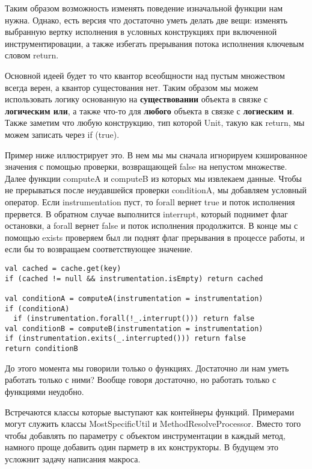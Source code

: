 Таким образом возможность изменять поведение изначальной функции нам нужна.
Однако, есть версия что достаточно уметь делать две вещи:
изменять выбранную вертку исполнения в условных конструкциях при включенной
инструментировации, а также избегать прерывания потока исполнения ключевым словом return.

Основной идеей будет то что квантор всеобщности над пустым множеством всегда
верен, а квантор сущестования нет.
Таким образом мы можем использовать логику основанную на \textbf{существовании} объекта
в связке с \textbf{логическим или}, а также что-то для \textbf{любого} объекта
в связке с \textbf{логиеским и}.
Также заметим что любую конструкцию, тип которой Unit, такую как return,
мы можем записать через if (true).

Пример ниже иллюстрирует это.
В нем мы мы сначала игнорируем кэшированное значения с помощью проверки,
возвращающей false на непустом множестве.
Далее функции computeA и computeB из которых мы извлекаем данные.
Чтобы не прерываться после неудавшейся проверки conditionA, мы добавляем
условный оператор.
Если instrumentation пуст, то forall вернет true и поток исполнения прервется.
В обратном случае выполнится interrupt, который поднимет флаг остановки, а
forall вернет false и поток исполнения продолжится.
В конце мы с помощью exists проверяем был ли поднят флаг прерывания в процессе работы,
и если бы то возвращаем соответствующее значение.

\begin{lstlisting}[caption={Влияние на первоначальную логику}]
val cached = cache.get(key)
if (cached != null && instrumentation.isEmpty) return cached

val conditionA = computeA(instrumentation = instrumentation)
if (conditionA)
  if (instrumentation.forall(!_.interrupt())) return false
val conditionB = computeB(instrumentation = instrumentation)
if (instrumentation.exits(_.interrupted())) return false
return conditionB
\end{lstlisting}

До этого момента мы говорили только о функциях.
Достаточно ли нам уметь работать только с ними?
Вообще говоря достаточно, но работать только с функциями неудобно.

Встречаются классы которые выступают как контейнеры функций.
Примерами могут служить классы MostSpecificUtil и MethodResolveProcessor.
Вместо того чтобы добавлять по параметру с объектом инструментации в каждый
метод, намного проще добавить один парметр в их конструкторы.
В будущем это усложнит задачу написания макроса.

